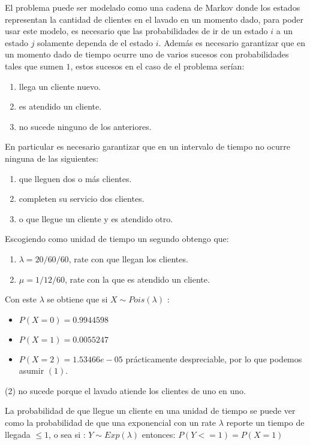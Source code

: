 \documentclass[14pt]{extarticle}
\begin{document}
El problema puede ser modelado como una cadena de Markov donde los estados representan la cantidad de clientes en el lavado en un momento dado, para poder usar este modelo, es necesario que las probabilidades de ir de un estado $i$ a un estado $j$ solamente dependa de el estado $i$. Además es necesario garantizar que en un momento dado de tiempo ocurre uno de varios sucesos con probabilidades tales que sumen $1$, estos sucesos en el caso de el problema serían:

\begin{enumerate}
    \item llega un cliente nuevo.
    \item es atendido un cliente.
    \item no sucede ninguno de los anteriores.
\end{enumerate}
	
En particular es necesario garantizar que en un intervalo de tiempo no ocurre ninguna de las siguientes:
\begin{enumerate}
    \item que lleguen dos o más clientes.
    \item completen su servicio dos clientes.
    \item o que llegue un cliente y es atendido otro.
\end{enumerate}

Escogiendo como unidad de tiempo un segundo obtengo que:
\begin{enumerate}
	\item $\lambda = 20 / 60 / 60$, rate con que llegan los clientes.
	\item $\mu = 1 / 12 / 60$, rate con la que es atendido un cliente.
\end{enumerate}
	
Con este $\lambda$ se obtiene que si $X \sim Pois(\lambda)$ :
\begin{itemize}
    \item $P( X = 0 )  = 0.9944598$
    \item $P( X = 1 )  = 0.0055247$
    \item $P( X = 2 )  = 1.53466e-05$ prácticamente despreciable, por lo que podemos asumir $(1)$.
\end{itemize}

(2) no sucede porque el lavado atiende los clientes de uno en uno.

La probabilidad de que llegue un cliente en una unidad de tiempo se puede ver como la probabilidad de que una exponencial con un rate $\lambda$ reporte un tiempo de llegada $ \leq 1$, o sea si : $Y \sim Exp(\lambda)$ entonces: $P( Y <= 1) = P( X = 1)$
\end{document}
